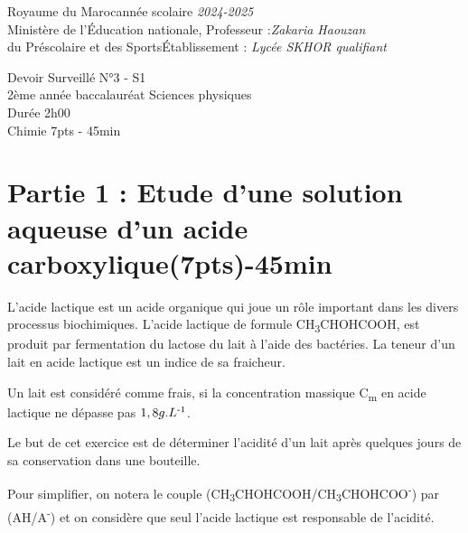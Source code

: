 \documentclass[12pt]{article}
\newcommand\headerMe[2]{\noindent{}#1\hfill#2}
\begin{document}
\headerMe{Royaume du Maroc}{année scolaire \emph{2024-2025}}\\
\headerMe{Ministère de l'Éducation nationale, }{  Professeur :\emph{Zakaria Haouzan}}\\
\headerMe{du Préscolaire et des Sports}{Établissement : \emph{Lycée SKHOR qualifiant}}\\
\begin{center}
Devoir Surveillé  N°3 - S1 \\
    2ème année baccalauréat Sciences physiques\\
Durée 2h00
\\
    \vspace{.2cm}
\hrulefill
\Large{Chimie 7pts - 45min}
\hrulefill\\

\end{center}

 \section*{Partie 1 : Etude d’une solution aqueuse d’un acide carboxylique\dotfill(7pts)-45min }



L'acide lactique est un acide organique qui joue un rôle important dans les divers processus biochimiques.
L'acide lactique de formule CH\textsubscript{3}CHOHCOOH, est produit par fermentation du lactose du lait à l'aide des bactéries. La teneur d'un lait en acide lactique est un indice de sa fraicheur. 

Un lait est considéré comme frais, si la concentration massique C\textsubscript{m} en acide lactique ne dépasse pas $1,8 g.L\textsuperscript{-1}$.

Le but de cet exercice est de déterminer l'acidité d'un lait après quelques jours de sa conservation dans une bouteille.

Pour simplifier, on notera le couple (CH\textsubscript{3}CHOHCOOH/CH\textsubscript{3}CHOHCOO\textsuperscript{-}) par (AH/A\textsuperscript{-}) et on considère que seul l'acide lactique est responsable de l'acidité.
\end{document}
